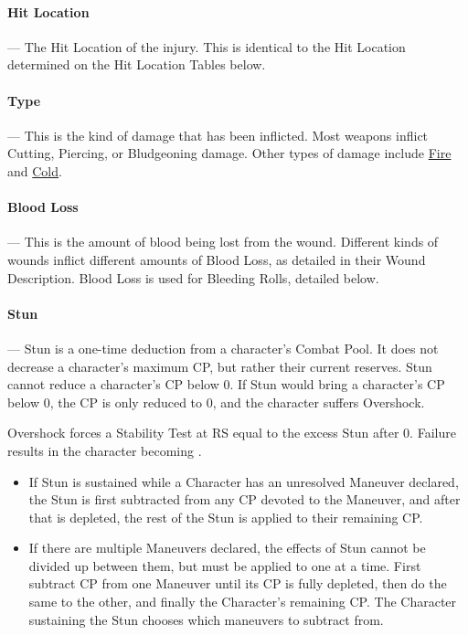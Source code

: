 \documentclass[oneside,11pt,english]{book}
\begin{document}
\paragraph{Hit Location}---\quad
The Hit Location of the injury. This is identical to the Hit Location determined on the Hit Location Tables below.

\paragraph{Type}---\quad
This is the kind of damage that has been inflicted. Most weapons inflict Cutting, Piercing, or Bludgeoning damage. Other types of damage include \hyperref[wound:Burn Damage]{Fire} and \hyperref[wound:Cold Damage]{Cold}.
\paragraph{Blood Loss}---\quad
This is the amount of blood being lost from the wound. Different kinds of wounds inflict different amounts of Blood Loss, as detailed in their Wound Description. Blood Loss is used for Bleeding Rolls, detailed below. 

\paragraph{Stun}---\quad
Stun is a one-time deduction from a character's Combat Pool. It does not decrease a character's maximum CP, but rather their current reserves. Stun cannot reduce a character's CP below 0. If Stun would bring a character's CP below 0, the CP is only reduced to 0, and the character suffers Overshock.

\label{par:Overshock}Overshock forces a Stability Test at RS equal to the excess Stun after 0. Failure results in the character becoming . %

\begin{itemize}
\item If Stun is sustained while a Character has an unresolved Maneuver declared, the Stun is first 
subtracted from any CP devoted to the Maneuver, and after that is depleted, the rest of the Stun is 
applied to their remaining CP. 
\item If there are multiple Maneuvers declared, the effects of Stun cannot be divided up between them, 
but must be applied to one at a time. First subtract CP from one Maneuver until its CP is fully 
depleted, then do the same to the other, and finally the Character’s remaining CP. The Character 
sustaining the Stun chooses which maneuvers to subtract from. 
\end{itemize}
\end{document}
